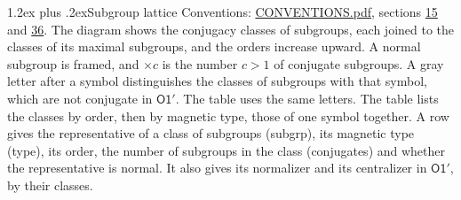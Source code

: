 \documentclass[10pt,a4paper]{article}
\makeatletter
\renewcommand\section{\@startsection{section}{1}{\z@}{-3ex plus -1ex minus -.2ex}%
  {1.2ex plus .2ex}{\normalfont\large\sffamily\bfseries\color{parttitle}}}
\numberwithin{equation}{section}
\newcommand{\grp}[1]{\mathsf{#1}}
\makeatother
\begin{document}
\section{Subgroup lattice}\label{s:subgroups}
Conventions: \href{../../CONVENTIONS.pdf}{CONVENTIONS.pdf}, sections \href{../../../rotation/CONVENTIONS.pdf\#conv.15}{15} and \href{../../CONVENTIONS.pdf\#conv.36}{36}.
The diagram shows the conjugacy classes of subgroups, each joined to the classes of its maximal subgroups, and the orders increase upward. \label{n:index.conjugates.c}\label{n:mark.conjugates}A normal subgroup is framed, and ${\times}c$ is the number $c > 1$ of conjugate subgroups. \label{n:mark.letter}A gray letter after a symbol distinguishes the classes of subgroups with that symbol, which are not conjugate in $\grp{O1'}$. The table uses the same letters. The table lists the classes by order, then by magnetic type, those of one symbol together. \label{n:head.subgroup}\label{n:head.magnetic.type}\label{n:head.order}\label{n:head.conjugates}\label{n:head.normal}A row gives the representative of a class of subgroups (subgrp), its magnetic type (type), its order, the number of subgroups in the class (conjugates) and whether the representative is normal. \label{n:head.normalizer}\label{n:head.centralizer}It also gives its normalizer and its centralizer in $\grp{O1'}$, by their classes. 
\end{document}
